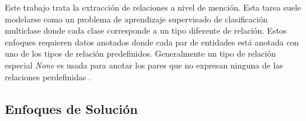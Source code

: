 



Este trabajo trata la extracción de relaciones a nivel de mención. Esta tarea suele modelarse como un problema de aprendizaje supervisado de clasificación multiclase donde cada clase corresponde a un tipo diferente de relación. Estos enfoques requieren datos anotados donde cada par de entidades está anotada con uno de los tipos de relación predefinidos. Generalmente un tipo de relación especial \textit{None} es usada para anotar los pares que no expresan ninguna de las relaciones perdefinidas \cite{pawar2017survey}. 

\subsection{Enfoques de Solución}

